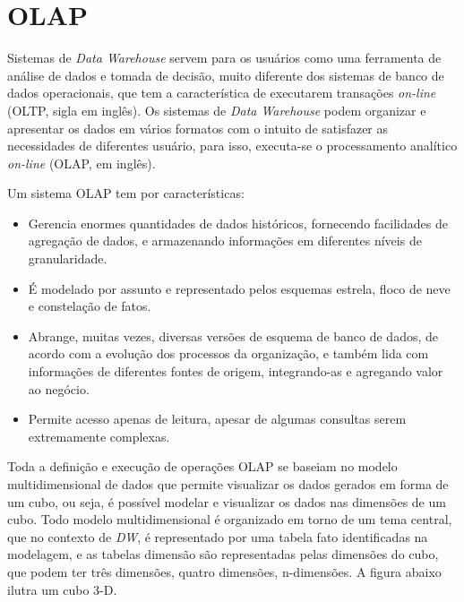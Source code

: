 \section{OLAP}

Sistemas de \textit{Data Warehouse} servem para os usuários como uma ferramenta de análise de dados e tomada de decisão, muito diferente dos sistemas de banco de dados operacionais, que tem a característica de executarem transações \textit{on-line} (OLTP, sigla em inglês). Os sistemas de \textit{Data Warehouse} podem organizar e apresentar os dados em vários formatos com o intuito de satisfazer as necessidades de diferentes usuário, para isso, executa-se o processamento analítico \textit{on-line} (OLAP, em inglês). \cite{han}

Um sistema OLAP tem por características: 
\begin{itemize}
	\item Gerencia enormes quantidades de dados históricos, fornecendo facilidades de agregação de dados, e armazenando informações em diferentes níveis de granularidade. \cite{han}
	\item É modelado por assunto e representado pelos esquemas estrela, floco de neve e constelação de fatos. \cite{han}
	\item Abrange, muitas vezes, diversas versões de esquema de banco de dados, de acordo com a evolução dos processos da organização, e também lida com informações de diferentes fontes de origem, integrando-as e agregando valor ao negócio. \cite{han}
	\item Permite acesso apenas de leitura, apesar de algumas consultas serem extremamente complexas. \cite{han}
\end{itemize}

Toda a definição e execução de operações OLAP se baseiam no modelo multidimensional de dados que permite visualizar os dados gerados em forma de um cubo, ou seja, é possível modelar e visualizar os dados nas dimensões de um cubo. Todo modelo multidimensional é organizado em torno de um tema central, que no contexto de \textit{DW}, é representado por uma tabela fato identificadas na modelagem, e as tabelas dimensão são representadas pelas dimensões do cubo, que podem ter três dimensões, quatro dimensões, n-dimensões. \cite{han}
A figura abaixo ilutra um cubo 3-D.

